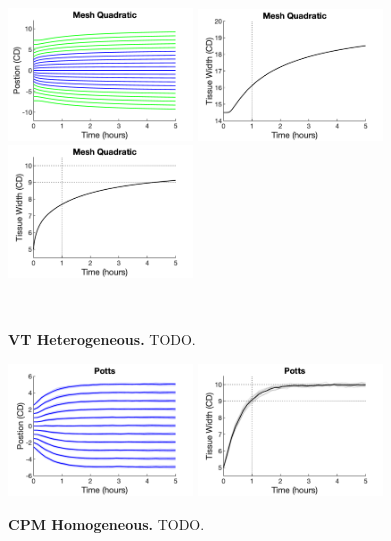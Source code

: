 \documentclass[12pt]{article}
\begin{document}
\begin{figure}[h]
%
\begin{center}
\includegraphics[width=4.9cm, trim={0.0cm 0.0cm 0.0cm 0.0cm}, clip]{Figs/Test02aMonolayerGrowth1dChainHeterogeneousChainMesh_Quadratic.png}
\includegraphics[width=4.9cm, trim={0.0cm 0.0cm 0.0cm 0.0cm}, clip]{Figs/Test02aMonolayerGrowth1dChainHeterogeneousChainMesh_QuadraticWidth}
\includegraphics[width=4.9cm, trim={0.0cm 0.0cm 0.0cm 0.0cm}, clip]{Figs/Test02aMonolayerGrowth1dChainHeterogeneousChainMesh_QuadraticInnerWidth}
\end{center}\
\vspace{-0.5cm}
\caption{{\bf VT Heterogeneous.} 
	TODO. }
\label{fig:todo}
\end{figure}

\begin{figure}[h]
%
\begin{center}
\includegraphics[width=4.9cm, trim={0.0cm 0.0cm 0.0cm 0.0cm}, clip]{Figs/Test02aMonolayerGrowth1dChainHomogeneousChainPotts.png}
\includegraphics[width=4.9cm, trim={0.0cm 0.0cm 0.0cm 0.0cm}, clip]{Figs/Test02aMonolayerGrowth1dChainHomogeneousChainPottsWidth}
\end{center}
\vspace{-0.5cm}
\caption{{\bf CPM Homogeneous.} 
	TODO. }
\label{fig:todo}
\end{figure}
\end{document}
